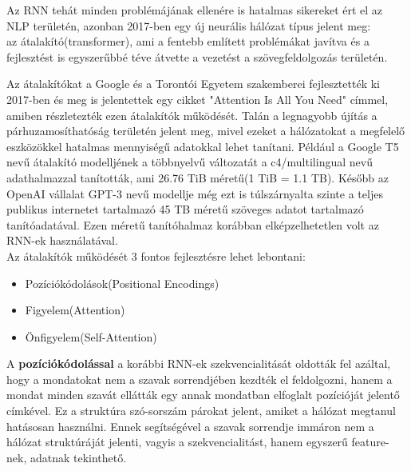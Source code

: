 Az RNN tehát minden problémájának ellenére is hatalmas sikereket ért el az NLP területén, azonban 2017-ben egy új neurális hálózat típus jelent meg:\\
az átalakító(transformer), ami a fentebb említett problémákat javítva és a fejlesztést is egyszerűbbé téve átvette a vezetést a szövegfeldolgozás területén.

Az átalakítókat a Google és a Torontói Egyetem szakemberei fejlesztették ki 2017-ben és meg is jelentettek egy cikket "Attention Is All You Need"\cite{attention} címmel, amiben részletezték ezen átalakítók működését. Talán a legnagyobb újítás a párhuzamosíthatóság területén jelent meg, mivel ezeket a hálózatokat a megfelelő eszközökkel hatalmas mennyiségű adatokkal lehet tanítani. Például a Google T5 nevű átalakító modelljének a többnyelvű változatát a c4/multilingual nevű adathalmazzal tanították, ami 26.76 TiB méretű(1 TiB = 1.1 TB). Később az OpenAI vállalat GPT-3 nevű modellje még ezt is túlszárnyalta szinte a teljes publikus internetet tartalmazó 45 TB méretű szöveges adatot tartalmazó tanítóadatával. Ezen méretű tanítóhalmaz korábban elképzelhetetlen volt az RNN-ek használatával.\\
Az átalakítók működését 3 fontos fejlesztésre lehet lebontani:

\begin{itemize}
\item Pozíciókódolások(Positional Encodings)
\item Figyelem(Attention)
\item Önfigyelem(Self-Attention)
\end{itemize}

A \textbf{pozíciókódolással} a korábbi RNN-ek szekvencialitását oldották fel azáltal, hogy a mondatokat nem a szavak sorrendjében kezdték el feldolgozni, hanem a mondat minden szavát ellátták egy annak mondatban elfoglalt pozícióját jelentő címkével. Ez a struktúra szó-sorszám párokat jelent, amiket a hálózat megtanul hatásosan használni. Ennek segítségével a szavak sorrendje immáron nem a hálózat struktúráját jelenti, vagyis a szekvencialitást, hanem egyszerű feature-nek, adatnak tekinthető.

